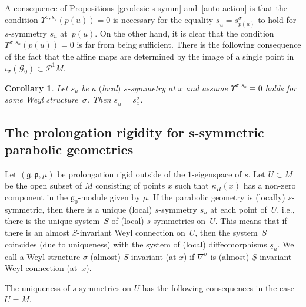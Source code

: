 \documentclass[pdftex]{sigma}
\newcommand{\si}{\sigma}
\newcommand{\un}{\underline}
\newcommand{\ba}{\mathcal{G}}
\newcommand{\fg}{\mathfrak g}
\newcommand{\fp}{\mathfrak p}
\newcommand{\U}{\Upsilon}
\numberwithin{equation}{section}
\newtheorem{Corollary}[Theorem]{Corollary}
\begin{document}
A consequence of Propositions \ref{geodesic-s-symm} and~\ref{auto-action} is that the condition $\U^{\si,s_u}(p(u))=0$ is necessary for the equality $\un s_u=s^\si_{p(u)}$ to hold for $s$-symmetry $s_u$ at~$p(u)$. On the other hand, it is clear that the condition $\U^{\si,s_u}(p(u))=0$ is far from being suf\/f\/icient. There is the following consequence of the fact that the af\/f\/ine maps are determined by the image of a single point in $\iota_\si(\ba_0)\subset \mathcal{P}^1M$.

\begin{Corollary}\label{c3.3}
Let $s_u$ be a $($local$)$ $s$-symmetry at $x$ and assume $\U^{\si,s_u}\equiv 0$ holds for some Weyl structu\-re~$\si$. Then $\un s_u=s_x^{\si}$.
\end{Corollary}

\subsection[The prolongation rigidity for $s$-symmetric parabolic geometries]{The prolongation rigidity for $\boldsymbol{s}$-symmetric parabolic geometries}\label{sec4.3}

Let $(\fg,\fp,\mu)$ be prolongation rigid outside of the $1$-eigenspace of $s$. Let $U\subset M$ be the open subset of $M$ consisting of points $x$ such that $\kappa_H(x)$ has a non-zero component in the $\fg_0$-module given by $\mu$. If the parabolic geometry is (locally) $s$-symmetric, then there is a unique (local) $s$-symmetry $s_u$ at each point of~$U$, i.e., there is the unique system~$S$ of (local) $s$-symmetries on~$U$. This means that if there is an almost $\un S$-invariant Weyl connection on~$U$, then the system~$\un S$ coincides (due to uniqueness) with the system of (local) dif\/feomorphisms $\un s_u$. We call a Weyl structure $\si$ (almost) $S$-invariant (at $x$) if $\nabla^\si$ is (almost) $\un S$-invariant Weyl connection (at~$x$).

The uniqueness of $s$-symmetries on $U$ has the following consequences in the case $U=M$.
\end{document}
